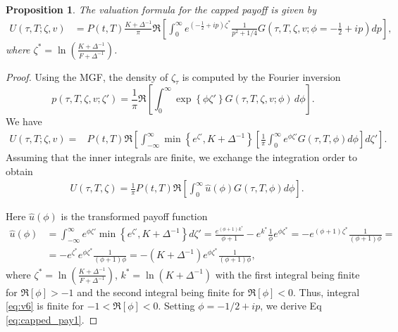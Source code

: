 \documentclass[pdftex,11pt,a4paper] {article}
\newtheorem{proposition}{Proposition}[section]
\begin{document}
\begin{proposition}\label{sc:capped}
The valuation formula for the capped payoff is given by
\begin{equation} \label{eq:capped_pay1}
\begin{split}
  U(\tau, T; \zeta,v)&  = P(t,T)\frac{K+\Delta^{-1}}{\pi} \Re\left[\int^{\infty}_{0} e^{(-\frac{1}{2}+ip) \zeta^{*}}  \frac{1}{p^{2}+1/4} G(\tau,T,\zeta,v; \phi=-\frac{1}{2}+ip)dp\right],
  \end{split} 
\end{equation}
where $\zeta^{*}=\ln\left(\frac{K+\Delta^{-1}}{F+\Delta^{-1}}\right)$. 
\end{proposition}
\begin{proof}

Using the MGF, the density of $\zeta_{\tau}$ is computed by the Fourier inversion
\begin{equation}\label{eq:v3}
 p(\tau,T,\zeta, v; \zeta') = \frac{1}{\pi}\Re\left[ \int^{\infty}_{0}\exp \left\{ \phi \zeta' \right\} G(\tau,T, \zeta,v; \phi)\,d\phi\right].
\end{equation}
We have
\begin{equation*}
\begin{split}
    U(\tau, T; \zeta,v) = &P(t,T)\Re\left[ \int^{\infty}_{-\infty}\min\left\{e^{\zeta'},K+\Delta^{-1}\right\} \left[\frac{1}{\pi} \int^{\infty}_{0}e^{\phi \zeta'} G(\tau,T, \phi)d\phi\right]d\zeta'\right].
\end{split} 
\end{equation*}
Assuming that the inner integrals are finite, we exchange the integration order to obtain
\begin{equation} \label {eq:v5}
\begin{split}
  & U(\tau, T, \zeta) = \frac{1}{\pi} P(t,T) \Re\left[\int^{\infty}_{0}\widehat{u}(\phi)G(\tau,T, \phi)d\phi\right].
\end{split} 
\end{equation}


Here $\widehat{u}(\phi)$ is the transformed payoff function
\begin{equation} \label {eq:v6}
\begin{split}
   \widehat{u}(\phi) & =  \int^{\infty}_{-\infty}e^{\phi \zeta'} \min\left\{e^{\zeta'},K+\Delta^{-1}\right\}  d\zeta'  = \frac{e^{(\phi+1) k^{*}}}{\phi+1} - e^{k^{*}}\frac{1}{\phi}e^{\phi \zeta^{*}} = -  e^{(\phi+1) \zeta^{*}} \frac{1}{(\phi+1)\phi}=\\
		& =- e^{\zeta^{*}}e^{\phi \zeta^*}\frac{1}{(\phi+1)\phi} = -(K+\Delta^{-1}) e^{\phi \zeta^{*}} \frac{1}{(\phi+1)\phi},
\end{split} 
\end{equation}
where $\zeta^{*}=\ln\left(\frac{K+\Delta^{-1}}{F+\Delta^{-1}}\right)$, $k^{*}=\ln(K+\Delta^{-1})$ with the first integral being finite for $\Re[\phi]>-1$ and the second integral being finite for $\Re[\phi]<0$. Thus, integral \eqref{eq:v6} is finite for $-1<\Re[\phi]<0$. Setting $\phi=-1/2+ip$, we derive Eq \eqref{eq:capped_pay1}.

\end{proof}
\end{document}
